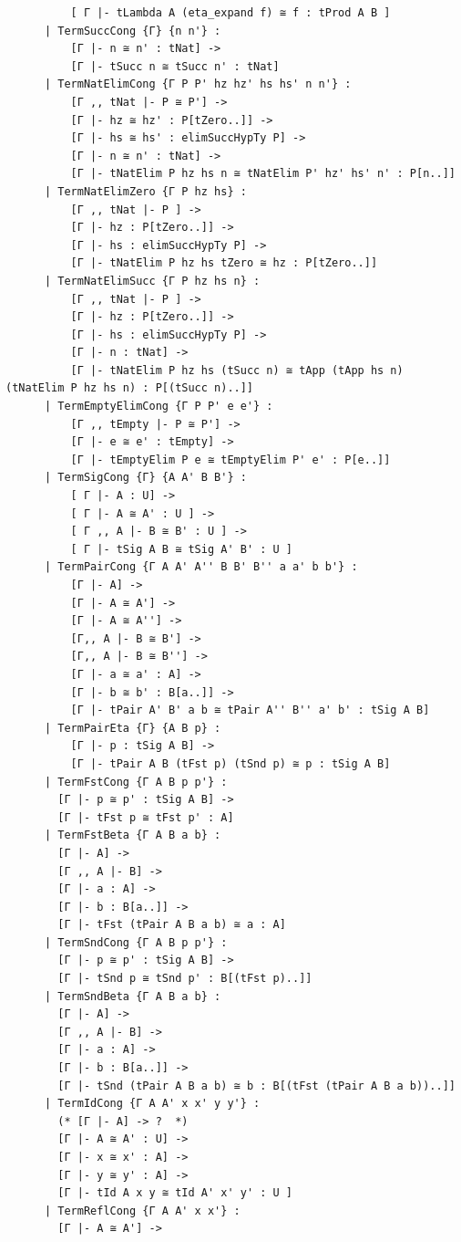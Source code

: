\documentclass[10pt,a4paper]{amsart}
\begin{document}
\begin{lstlisting}
          [ Γ |- tLambda A (eta_expand f) ≅ f : tProd A B ]
      | TermSuccCong {Γ} {n n'} :
          [Γ |- n ≅ n' : tNat] ->
          [Γ |- tSucc n ≅ tSucc n' : tNat]
      | TermNatElimCong {Γ P P' hz hz' hs hs' n n'} :
          [Γ ,, tNat |- P ≅ P'] ->
          [Γ |- hz ≅ hz' : P[tZero..]] ->
          [Γ |- hs ≅ hs' : elimSuccHypTy P] ->
          [Γ |- n ≅ n' : tNat] ->
          [Γ |- tNatElim P hz hs n ≅ tNatElim P' hz' hs' n' : P[n..]]        
      | TermNatElimZero {Γ P hz hs} :
          [Γ ,, tNat |- P ] ->
          [Γ |- hz : P[tZero..]] ->
          [Γ |- hs : elimSuccHypTy P] ->
          [Γ |- tNatElim P hz hs tZero ≅ hz : P[tZero..]]
      | TermNatElimSucc {Γ P hz hs n} :
          [Γ ,, tNat |- P ] ->
          [Γ |- hz : P[tZero..]] ->
          [Γ |- hs : elimSuccHypTy P] ->
          [Γ |- n : tNat] ->
          [Γ |- tNatElim P hz hs (tSucc n) ≅ tApp (tApp hs n) (tNatElim P hz hs n) : P[(tSucc n)..]]
      | TermEmptyElimCong {Γ P P' e e'} :
          [Γ ,, tEmpty |- P ≅ P'] ->
          [Γ |- e ≅ e' : tEmpty] ->
          [Γ |- tEmptyElim P e ≅ tEmptyElim P' e' : P[e..]]
      | TermSigCong {Γ} {A A' B B'} :
          [ Γ |- A : U] ->
          [ Γ |- A ≅ A' : U ] ->
          [ Γ ,, A |- B ≅ B' : U ] ->
          [ Γ |- tSig A B ≅ tSig A' B' : U ]
      | TermPairCong {Γ A A' A'' B B' B'' a a' b b'} :
          [Γ |- A] ->
          [Γ |- A ≅ A'] ->
          [Γ |- A ≅ A''] ->
          [Γ,, A |- B ≅ B'] ->
          [Γ,, A |- B ≅ B''] ->
          [Γ |- a ≅ a' : A] ->
          [Γ |- b ≅ b' : B[a..]] ->
          [Γ |- tPair A' B' a b ≅ tPair A'' B'' a' b' : tSig A B]
      | TermPairEta {Γ} {A B p} :
          [Γ |- p : tSig A B] ->
          [Γ |- tPair A B (tFst p) (tSnd p) ≅ p : tSig A B]
      | TermFstCong {Γ A B p p'} :
        [Γ |- p ≅ p' : tSig A B] ->
        [Γ |- tFst p ≅ tFst p' : A]
      | TermFstBeta {Γ A B a b} :
        [Γ |- A] ->
        [Γ ,, A |- B] ->
        [Γ |- a : A] ->
        [Γ |- b : B[a..]] ->
        [Γ |- tFst (tPair A B a b) ≅ a : A]
      | TermSndCong {Γ A B p p'} :
        [Γ |- p ≅ p' : tSig A B] ->
        [Γ |- tSnd p ≅ tSnd p' : B[(tFst p)..]]
      | TermSndBeta {Γ A B a b} :
        [Γ |- A] ->
        [Γ ,, A |- B] ->
        [Γ |- a : A] ->
        [Γ |- b : B[a..]] ->
        [Γ |- tSnd (tPair A B a b) ≅ b : B[(tFst (tPair A B a b))..]]
      | TermIdCong {Γ A A' x x' y y'} :
        (* [Γ |- A] -> ?  *)
        [Γ |- A ≅ A' : U] ->
        [Γ |- x ≅ x' : A] ->
        [Γ |- y ≅ y' : A] ->
        [Γ |- tId A x y ≅ tId A' x' y' : U ]
      | TermReflCong {Γ A A' x x'} :
        [Γ |- A ≅ A'] ->

\end{lstlisting}
\end{document}
